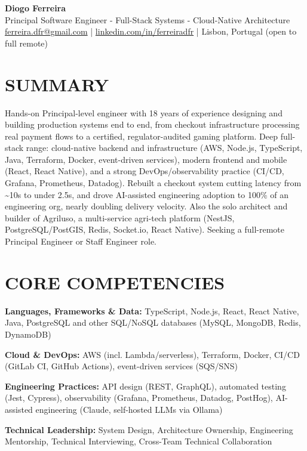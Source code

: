 \documentclass[11pt,a4paper]{article}
\newcommand{\skillrow}[2]{\textbf{\color{accent}#1:} #2\par\vspace{4pt}}
\begin{document}
\begin{center}
  {\fontsize{24}{26}\selectfont\bfseries\color{accent} Diogo Ferreira}\\[4pt]
  {\normalsize\color{subtext} Principal Software Engineer - Full-Stack Systems - Cloud-Native Architecture}\\[5pt]
  {\small
    \href{mailto:ferreira.dfr@gmail.com}{ferreira.dfr@gmail.com} | \href{https://linkedin.com/in/ferreiradfr}{linkedin.com/in/ferreiradfr} | Lisbon, Portugal (open to full remote)
  }
\end{center}

\section{SUMMARY}
Hands-on Principal-level engineer with 18 years of experience designing and building production systems end to end, from checkout infrastructure processing real payment flows to a certified, regulator-audited gaming platform. Deep full-stack range: cloud-native backend and infrastructure (AWS, Node.js, TypeScript, Java, Terraform, Docker, event-driven services), modern frontend and mobile (React, React Native), and a strong DevOps/observability practice (CI/CD, Grafana, Prometheus, Datadog). Rebuilt a checkout system cutting latency from \textasciitilde{}10s to under 2.5s, and drove AI-assisted engineering adoption to 100\% of an engineering org, nearly doubling delivery velocity. Also the solo architect and builder of Agriluso, a multi-service agri-tech platform (NestJS, PostgreSQL/PostGIS, Redis, Socket.io, React Native). Seeking a full-remote Principal Engineer or Staff Engineer role.

\section{CORE COMPETENCIES}
\skillrow{Languages, Frameworks \& Data}{TypeScript, Node.js, React, React Native, Java, PostgreSQL and other SQL/NoSQL databases (MySQL, MongoDB, Redis, DynamoDB)}
\skillrow{Cloud \& DevOps}{AWS (incl. Lambda/serverless), Terraform, Docker, CI/CD (GitLab CI, GitHub Actions), event-driven services (SQS/SNS)}
\skillrow{Engineering Practices}{API design (REST, GraphQL), automated testing (Jest, Cypress), observability (Grafana, Prometheus, Datadog, PostHog), AI-assisted engineering (Claude, self-hosted LLMs via Ollama)}
\skillrow{Technical Leadership}{System Design, Architecture Ownership, Engineering Mentorship, Technical Interviewing, Cross-Team Technical Collaboration}
\end{document}
